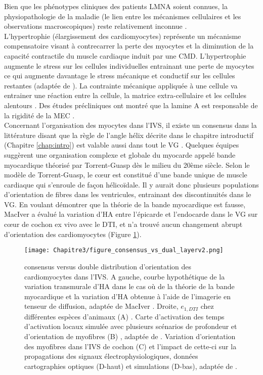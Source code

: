 Bien que les phénotypes cliniques des patients LMNA soient connues, la physiopathologie de la maladie (le lien entre les mécanismes cellulaires et les observations macroscopiques) reste relativement inconnue \cite{Crasto2020}. 
\\
L’hypertrophie (élargissement des cardiomyocytes) représente un mécanisme compensatoire visant à contrecarrer la perte des myocytes et la diminution de la capacité contractile du muscle cardiaque induit par une CMD. L’hypertrophie augmente le stress sur les cellules individuelles entrainant une perte de myocytes ce qui augmente davantage le stress mécanique et conductif sur les cellules restantes (adaptée de \cite{Mounkes2005}). La contrainte mécanique appliquée à une cellule va entrainer une réaction entre la cellule, la matrice extra-cellulaire et les cellules alentours \cite{Discher2005}. Des études précliniques ont montré que la lamine A est responsable de la rigidité de la MEC \cite{Swift2013}. 
\\
Concernant l’organisation des myocytes dans l’IVS, il existe un consensus dans la littérature disant que la règle de l’angle hélix décrite dans le chapitre introductif (Chapitre \ref{chap:intro}) est valable aussi dans tout le VG  \cite{MacIver2017_end_I} \cite{MacIver2017_end_II}. Quelques équipes \cite{Kocica2006} suggèrent une organisation complexe et globale du myocarde appelé bande myocardique théorisé par Torrent-Guasp dès le milieu du 20ème siècle. Selon le modèle de Torrent-Guasp, le cœur est constitué d’une bande unique de muscle cardiaque qui s’enroule de façon hélicoïdale. Il y aurait donc plusieurs populations d’orientation de fibres dans les ventricules, entrainant des discontinuités dans le VG. En voulant démontrer que la théorie de la bande myocardique est fausse, MacIver a évalué la variation d’HA entre l’épicarde et l’endocarde dans le VG sur cœur de cochon ex vivo avec le DTI, et n’a trouvé aucun changement abrupt d’orientation des cardiomyocytes (Figure \ref{fig:consensus}). 
\\

\begin{figure}[!ht]
  \begin{center}
    \texttt{[image: Chapitre3/figure\_consensus\_vs\_dual\_layerv2.png]}
  \end{center}
  \caption{consensus versus double distribution d'orientation des cardiomyocytes dans l'IVS. A gauche, courbe hypothétique de la variation transmurale d’HA dans le cas où de la théorie de la bande myocardique et la variation d’HA obtenue à l’aide de l’imagerie en tenseur de diffusion, adaptée de MacIver \cite{MacIver2017_end_I} \cite{MacIver2017_end_II}. Droite, $e_{1,DTI}$ chez différentes espèces d’animaux (A) \cite{RodrguezPadilla2022}. Carte d’activation des temps d’activation locaux simulée avec plusieurs scénarios de profondeur et d’orientation de myofibres (B) , adaptée de \cite{RodrguezPadilla2022}. Variation d’orientation des myofibres dans l’IVS de cochon (C) et l’impact de cette-ci sur la propagations des signaux électrophysiologiques, données cartographies optiques (D-haut) et simulations (D-bas), adaptée de \cite{Vetter2005}. }
  \label{fig:consensus}
\end{figure}

